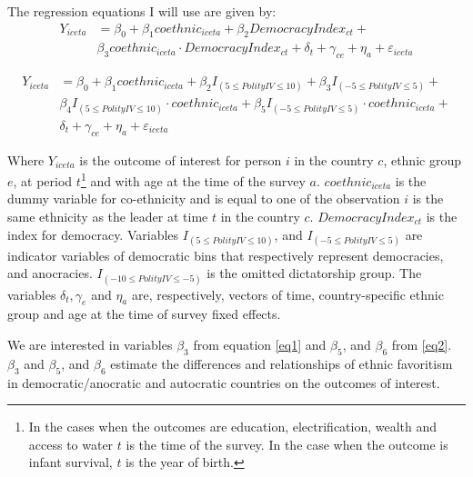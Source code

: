 \documentclass{wptemp}
\begin{document}
The regression equations I will use are given by:
\begin{equation}\label{eq1}
\begin{split}
   Y_{iceta} &= \beta_{0} + \beta_{1}coethnic_{iceta} + \beta_{2}DemocracyIndex_{ct} + \\
   & \beta_{3}coethnic_{iceta} \cdot DemocracyIndex_{ct}   + \delta_{t} + \gamma_{ce} +\eta_{a}  + \varepsilon_{iceta}
\end{split}
\end{equation}

\begin{equation}\label{eq2}
\begin{split}
    Y_{iceta} &= \beta_{0} + \beta_{1}coethnic_{iceta} + \beta_{2} I_{(5\leq Polity IV \leq 10)} + \beta_{3} I_{(-5\leq Polity IV \leq 5)} + \\
    &\beta_{4} I_{(5\leq Polity IV \leq 10)} \cdot  coethnic_{iceta} + \beta_{5} I_{(-5\leq Polity IV \leq 5)} \cdot  coethnic_{iceta} + \\
    &\delta_{t} + \gamma_{ce} +\eta_{a}  + \varepsilon_{iceta}
    \end{split}
\end{equation}

Where $Y_{iceta}$ is the outcome of interest for person $i$ in the country $c$, ethnic group $e$, at period $t$\footnote{In the cases when the outcomes are education, electrification, wealth and access to water $t$ is the time of the survey. In the case when the outcome is infant survival, $t$ is the year of birth.} and with age at the time of the survey $a$. $coethnic_{iceta}$ is the dummy variable for co-ethnicity and is equal to one of the observation $i$ is the same ethnicity as the leader at time $t$ in the country $c$. $DemocracyIndex_{ct}$ is the index for democracy. Variables $I_{(5\leq Polity IV \leq 10)}$, and $I_{(-5\leq Polity IV \leq 5)}$ are indicator variables of democratic bins that respectively represent democracies, and anocracies. $I_{(-10\leq Polity IV \leq -5)}$ is the omitted dictatorship group. The variables $\delta_{t}, \gamma_{e}$ and $\eta_{a}$  are, respectively, vectors of time, country-specific ethnic group and age at the time of survey fixed effects.

We are interested in variables $\beta_{3}$ from equation \ref{eq1} and $\beta_{5}$, and $\beta_{6}$ from \ref{eq2}. $\beta_{3}$ and $\beta_{5}$, and $\beta_{6}$ estimate the differences and relationships of ethnic favoritism in democratic/anocratic and autocratic countries on the outcomes of interest.
\end{document}

